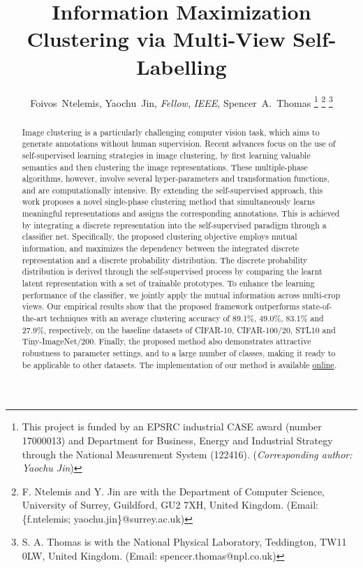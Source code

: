 \documentclass[journal]{IEEEtran}
\begin{document}
\title{Information Maximization Clustering via Multi-View Self-Labelling}

\author{Foivos~Ntelemis,
        Yaochu~Jin, \emph{Fellow}, \emph{IEEE},
        Spencer~A.~Thomas
\thanks{This project is funded by an EPSRC industrial CASE award (number 17000013) and Department for Business, Energy and Industrial Strategy through the National Measurement System (122416). (\textit{Corresponding author: Yaochu Jin})}
\thanks{F. Ntelemis and Y. Jin are with the Department of Computer Science, University of Surrey, Guildford, GU2 7XH, United Kingdom. (Email: \{f.ntelemis; yaochu.jin\}@surrey.ac.uk)}
\thanks{S. A. Thomas is with the National Physical Laboratory, Teddington, TW11 0LW, United Kingdom. (Email: spencer.thomas@npl.co.uk)}
}


\maketitle


\begin{abstract}

Image clustering is a particularly challenging computer vision task, which aims to generate annotations without human supervision. Recent advances focus on the use of self-supervised learning strategies in image clustering, by first learning valuable semantics and then clustering the image representations. These multiple-phase algorithms, however, involve several hyper-parameters and transformation functions, and are computationally intensive. By extending the self-supervised approach, this work proposes a novel single-phase clustering method that simultaneously learns meaningful representations and assigns the corresponding annotations. This is achieved by integrating a discrete representation into the self-supervised paradigm through a classifier net. Specifically, the proposed clustering objective employs mutual information, and maximizes the dependency between the integrated discrete representation and a discrete probability distribution. The discrete probability distribution is derived through the self-supervised process by comparing the learnt latent representation with a set of trainable prototypes. To enhance the learning performance of the classifier, we jointly apply the mutual information across multi-crop views. Our empirical results show that the proposed framework outperforms state-of-the-art techniques with an average clustering accuracy of 89.1\%, 49.0\%, 83.1\% and 27.9\%, respectively, on the baseline datasets of CIFAR-10, CIFAR-100/20, STL10 and Tiny-ImageNet/200. Finally, the proposed method also demonstrates attractive robustness to parameter settings, and to a large number of classes, making it ready to be applicable to other datasets. The implementation of our method is available  \href{https://github.com/foiv0s/imc-swav-pub}{online}.

\end{abstract}
\end{document}
